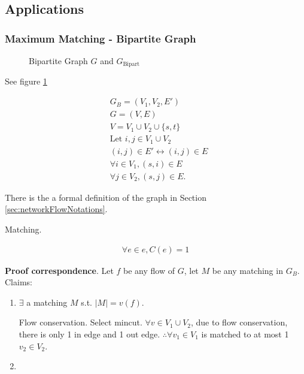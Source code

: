 \documentclass[a4paper]{report}
\theoremstyle{definition}
\begin{document}
\subsection{Applications}
\subsubsection{Maximum Matching - Bipartite Graph}
\begin{figure}[!htp]
\centering
{}
\caption{Bipartite Graph $G$ and $G_\text{Bipart}$}
\label{fig:bipart}
\end{figure}
See figure \ref{fig:bipart}

\begin{align*}
& G_B = (V_1, V_2, E') \\
& G=(V, E) \\
& V= V_1 \cup V_2\cup \{s, t\}\\
& \text{Let } i, j \in V_1 \cup V_2\\
& (i,j)\in E' \leftrightarrow (i, j)\in E\\
& \forall i \in V_1, (s, i) \in E \\
& \forall j \in V_2, (s, j) \in E.
\end{align*}

There is the a formal definition of the graph in Section \ref{sec:networkFlowNotations}.

Matching.

\begin{align*}
\forall e \in e, C(e) =1
\end{align*}

\textbf{Proof correspondence}. Let $f$ be any flow of $G$, let $M$ be any matching in $G_B$. Claims:
\begin{enumerate}
\item $\exists$ a matching $M$ s.t. $|M|=v(f)$.

Flow conservation. Select mincut. $\forall v \in V_1\cup V_2$, due to flow conservation, there is only 1 in edge and 1 out edge. $\therefore \forall v_1 \in V_1$ is matched to at most 1 $v_2 \in V_2. $
\item
\end{enumerate}
\end{document}
